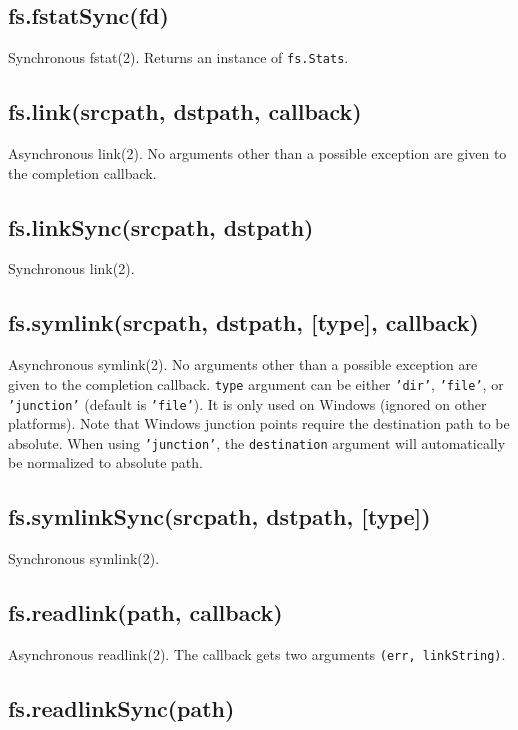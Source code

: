 \subsection{fs.fstatSync(fd)}

Synchronous fstat(2). Returns an instance of \texttt{fs.Stats}.

\subsection{fs.link(srcpath, dstpath, callback)}

Asynchronous link(2). No arguments other than a possible exception are
given to the completion callback.

\subsection{fs.linkSync(srcpath, dstpath)}

Synchronous link(2).

\subsection{fs.symlink(srcpath, dstpath, {[}type{]}, callback)}

Asynchronous symlink(2). No arguments other than a possible exception
are given to the completion callback. \texttt{type} argument can be
either \texttt{'dir'}, \texttt{'file'}, or \texttt{'junction'} (default
is \texttt{'file'}). It is only used on Windows (ignored on other
platforms). Note that Windows junction points require the destination
path to be absolute. When using \texttt{'junction'}, the
\texttt{destination} argument will automatically be normalized to
absolute path.

\subsection{fs.symlinkSync(srcpath, dstpath, {[}type{]})}

Synchronous symlink(2).

\subsection{fs.readlink(path, callback)}

Asynchronous readlink(2). The callback gets two arguments
\texttt{(err, linkString)}.

\subsection{fs.readlinkSync(path)}

